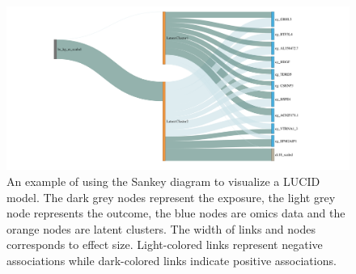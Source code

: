 \begin{figure}[]
    \centering
    \includegraphics[width = \textwidth]{figures/fig3.pdf}
    \caption{An example of using the Sankey diagram to visualize a LUCID model. The dark grey nodes represent the exposure, the light grey node represents the outcome, the blue nodes are omics data and the orange nodes are latent clusters. The width of links and nodes corresponds to effect size. Light-colored links represent negative associations while dark-colored links indicate positive associations.}
    \label{fig3}
\end{figure}
